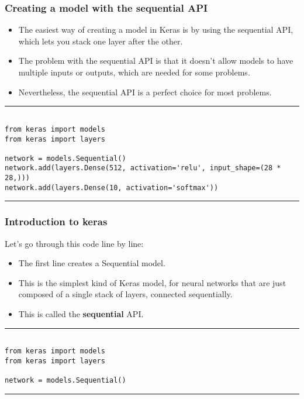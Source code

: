 \documentclass[11pt]{beamer}
\begin{document}
\begin{frame}[fragile]
\frametitle{Creating a model with the sequential API }
	\begin{itemize}
		\item The easiest way of creating a model in Keras is by using the sequential API, which lets you stack one layer after the other. 
		\item The problem with the sequential API is that it doesn't allow models to have multiple inputs or outputs, which are needed for some problems.
		\item Nevertheless, the sequential API is a perfect choice for most problems.
	\end{itemize}
\rule{\textwidth}{1pt}
\scriptsize
\begin{verbatim}

from keras import models
from keras import layers

network = models.Sequential()
network.add(layers.Dense(512, activation='relu', input_shape=(28 * 28,)))
network.add(layers.Dense(10, activation='softmax'))

\end{verbatim}
\rule{\textwidth}{1pt}
\end{frame}
\begin{frame}[fragile]
\frametitle{Introduction to keras}
Let’s go through this code line by line:
\begin{itemize}
\item The first line creates a Sequential model. 
\item This is the simplest kind of Keras model, for neural networks that are just composed of a single stack of layers, connected sequentially. 
\item This is called the \textbf{sequential} API.
\end{itemize}

\rule{\textwidth}{1pt}
\scriptsize
\begin{verbatim}

from keras import models
from keras import layers

network = models.Sequential()

\end{verbatim}
\rule{\textwidth}{1pt}
\end{frame}
\end{document}
